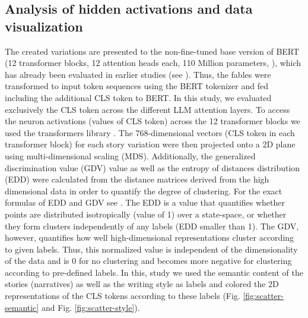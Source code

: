\subsection*{Analysis of hidden activations and data visualization}
The created variations are presented to the non-fine-tuned base version of BERT (12 transformer blocks, 12 attention heads each, 110 Million parameters, \cite{devlin2018bert}), which has already been evaluated in earlier studies (see \cite{rahwan2019machine}). Thus, the fables were transformed to input token sequences using the BERT tokenizer \cite{wu2016google, devlin2018bert} and fed including the additional CLS token to BERT. In this study, we evaluated exclusively the CLS token across the different LLM attention layers. To access the neuron activations (values of CLS token) across the 12 transformer blocks we used the transformers library \cite{wolf2020transformers}. The 768-dimensional vectors (CLS token in each transformer block) for each story variation were then projected onto a 2D plane using multi-dimensional scaling (MDS). Additionally, the generalized discrimination value (GDV) value as well as the entropy of distances distribution (EDD) were calculated from the distance matrices derived from the high dimensional data in order to quantify the degree of clustering. For the exact formulas of EDD and GDV see \cite{schilling2021quantifying,metzner2023beyond}. The EDD is a value that quantifies whether points are distributed isotropically (value of 1) over a state-space, or whether they form clusters independently of any labels \cite{metzner2023beyond} (EDD smaller than 1).
The GDV, however, quantifies how well high-dimensional representations cluster according to given labels. Thus, this normalized value is independent of the dimensionality of the data and is 0 for no clustering and becomes more negative for clustering according to pre-defined labels.  
In this, study we used the semantic content of the stories (narratives) as well as the writing style as labels and colored the 2D representations of the CLS tokens according to these labels (Fig. \ref{fig:scatter-semantic} and Fig. \ref{fig:scatter-style}).

